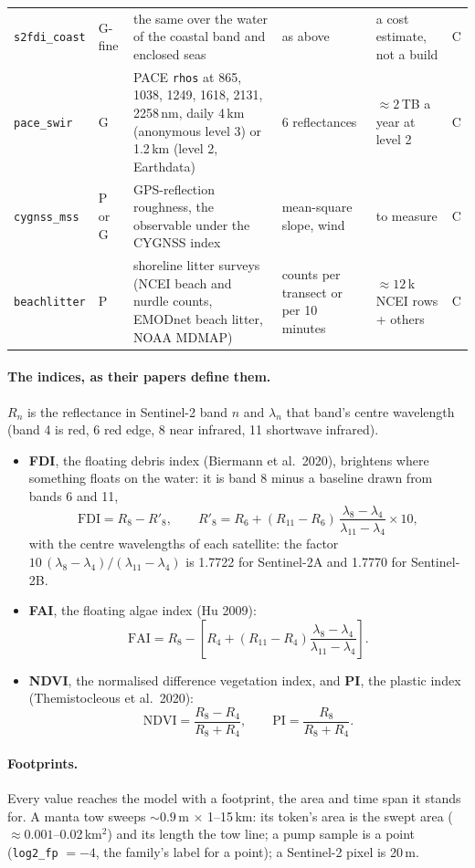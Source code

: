 \documentclass[10pt]{article}
\newcommand{\code}[1]{\texttt{#1}}
\begin{document}
{\begin{longtable}{@{}L{1.8cm}L{1.0cm}L{2.9cm}L{4.8cm}L{4.1cm}L{0.75cm}@{}}
\addlinespace
\code{s2fdi\_coast} & G-fine & the same over the water of the coastal band and enclosed seas & as above & a cost
estimate, not a build & C \\
\addlinespace
\code{pace\_swir} & G & PACE \code{rhos} at 865, 1038, 1249, 1618, 2131, 2258\,nm, daily 4\,km (anonymous level
3) or 1.2\,km (level 2, Earthdata) & 6 reflectances & $\approx 2$\,TB a year at level 2 & C \\
\addlinespace
\code{cygnss\_mss} & P or G & GPS-reflection roughness, the observable under the CYGNSS index & mean-square slope,
wind & to measure & C \\
\addlinespace
\code{beachlitter} & P & shoreline litter surveys (NCEI beach and nurdle counts, EMODnet beach litter, NOAA MDMAP)
& counts per transect or per 10 minutes & $\approx 12$\,k NCEI rows + others & C \\
\bottomrule
\end{longtable}}

\paragraph{The indices, as their papers define them.} $R_n$ is the reflectance in Sentinel-2 band $n$ and
$\lambda_n$ that band's centre wavelength (band 4 is red, 6 red edge, 8 near infrared, 11 shortwave infrared).
\begin{itemize}\itemsep2pt
\item \textbf{FDI}, the floating debris index (Biermann et al.\ 2020), brightens where something floats on the
water: it is band 8 minus a baseline drawn from bands 6 and 11,
\[
\mathrm{FDI} = R_8 - R'_8, \qquad
R'_8 = R_6 + \left(R_{11} - R_6\right)\,\frac{\lambda_8 - \lambda_4}{\lambda_{11} - \lambda_4}\times 10 ,
\]
with the centre wavelengths of each satellite: the factor $10\,(\lambda_8 - \lambda_4)/(\lambda_{11} - \lambda_4)$
is 1.7722 for Sentinel-2A and 1.7770 for Sentinel-2B.
\item \textbf{FAI}, the floating algae index (Hu 2009):
\[
\mathrm{FAI} = R_8 - \left[ R_4 + \left(R_{11} - R_4\right)\frac{\lambda_8 - \lambda_4}{\lambda_{11} - \lambda_4}\right].
\]
\item \textbf{NDVI}, the normalised difference vegetation index, and \textbf{PI}, the plastic index
(Themistocleous et al.\ 2020):
\[
\mathrm{NDVI} = \frac{R_8 - R_4}{R_8 + R_4}, \qquad \mathrm{PI} = \frac{R_8}{R_8 + R_4}.
\]
\end{itemize}

\paragraph{Footprints.} Every value reaches the model with a footprint, the area and time span it stands for. A
manta tow sweeps $\sim 0.9$\,m $\times$ 1--15\,km: its token's area is the swept area ($\approx 0.001$--0.02\,km$^2$)
and its length the tow line; a pump sample is a point (\code{log2\_fp} $= -4$, the family's label for a point); a
Sentinel-2 pixel is 20\,m.
\end{document}
